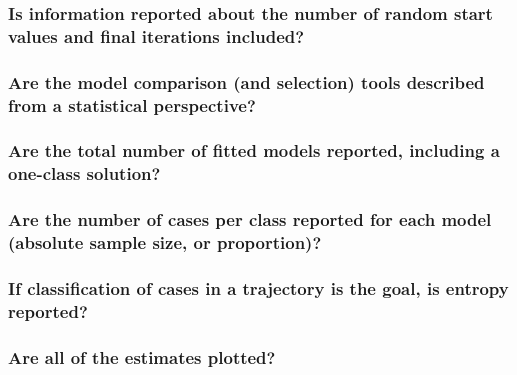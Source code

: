 \documentclass[man]{apa6}
\begin{document}
\hypertarget{is-information-reported-about-the-number-of-random-start-values-and-final-iterations-included}{%
\subsubsection{Is information reported about the number of random start values and final iterations included?}\label{is-information-reported-about-the-number-of-random-start-values-and-final-iterations-included}}

\hypertarget{are-the-model-comparison-and-selection-tools-described-from-a-statistical-perspective}{%
\subsubsection{Are the model comparison (and selection) tools described from a statistical perspective?}\label{are-the-model-comparison-and-selection-tools-described-from-a-statistical-perspective}}

\hypertarget{are-the-total-number-of-fitted-models-reported-including-a-one-class-solution}{%
\subsubsection{Are the total number of fitted models reported, including a one-class solution?}\label{are-the-total-number-of-fitted-models-reported-including-a-one-class-solution}}

\hypertarget{are-the-number-of-cases-per-class-reported-for-each-model-absolute-sample-size-or-proportion}{%
\subsubsection{Are the number of cases per class reported for each model (absolute sample size, or proportion)?}\label{are-the-number-of-cases-per-class-reported-for-each-model-absolute-sample-size-or-proportion}}

\hypertarget{if-classification-of-cases-in-a-trajectory-is-the-goal-is-entropy-reported}{%
\subsubsection{If classification of cases in a trajectory is the goal, is entropy reported?}\label{if-classification-of-cases-in-a-trajectory-is-the-goal-is-entropy-reported}}

\hypertarget{are-all-of-the-estimates-plotted}{%
\subsubsection{Are all of the estimates plotted?}\label{are-all-of-the-estimates-plotted}}
\end{document}
